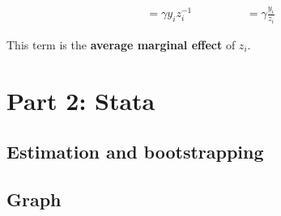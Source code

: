 \documentclass{article}
\begin{document}
\begin{align}
    = \gamma y_i z_i ^{-1} \hspace{2cm}= \gamma \frac{y_i}{z_i}
\end{align}

This term is the \textbf{average marginal effect} of $z_i$.


\vspace{10cm}
\section{Part 2: Stata}

\subsection{Estimation and bootstrapping}






\subsection{Graph}
\end{document}
